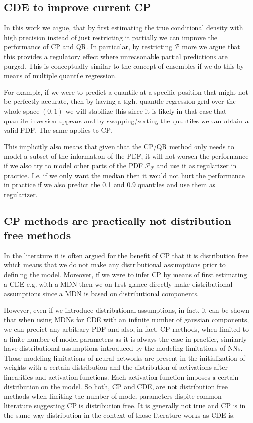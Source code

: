 \subsection{CDE to improve current CP}
In this work we argue, that by first estimating the true conditional density with high precision instead of just restricting it partially we can improve the performance of CP and QR. In particular, by restricting $\mathcal{P}$ more we argue that this provides a regulatory effect where unreasonable partial predictions are purged. This is conceptually similar to the concept of ensembles if we do this by means of multiple quantile regression.

For example, if we were to predict a quantile at a specific position that might not be perfectly accurate, then by having a tight quantile regression grid over the whole space $(0,1)$ we will stabilize this since it is likely in that case that quantile inversion appears and by swapping/sorting the quantiles we can obtain a valid PDF. The same applies to CP.

This implicitly also means that given that the CP/QR method only needs to model a subset of the information of the PDF, it will not worsen the performance if we also try to model other parts of the PDF $\mathcal{P}_{\theta'}$ and use it as regularizer in practice. I.e. if we only want the median then it would not hurt the performance in practice if we also predict the 0.1 and 0.9 quantiles and use them as regularizer.

\subsection{CP methods are practically not distribution free methods}
In the literature it is often argued for the benefit of CP that it is distribution free which means that we do not make any distributional assumptions prior to defining the model. Moreover, if we were to infer CP by means of first estimating a CDE e.g. with a MDN then we on first glance directly make distributional assumptions since a MDN is based on distributional components.

However, even if we introduce distributional assumptions, in fact, it can be shown that when using MDNs for CDE with an infinite number of gaussian components, we can predict any arbitrary PDF and also, in fact, CP methods, when limited to a finite number of model parameters as it is always the case in practice, similarly have distributional assumptions introduced by the modeling limitations of NNs. Those modeling limitations of neural networks are present in the initialization of weights with a certain distribution and the distribution of activations after linearities and activation functions. Each activation function imposes a certain distribution on the model. So both, CP and CDE, are not distribution free methods when limiting the number of model parameters dispite common literature suggesting CP is distribution free. It is generally not true and CP is in the same way distribution in the context of those literature works as CDE is.

